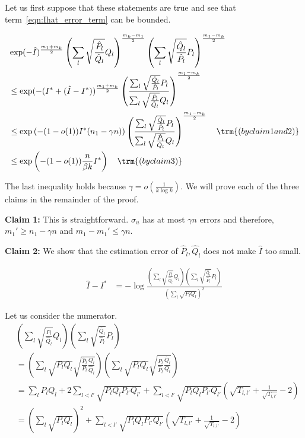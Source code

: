 \documentclass{article}
\begin{document}
Let us first suppose that these statements are true and see that term~\ref{eqn:Ihat_error_term} can be bounded. 


\begin{align*}
& \exp( - \hat{I} )^{\frac{m_1 + m_k}{2}}  \left( \sum_l \sqrt{\frac{\hat{P}_l}{\hat{Q}_l}} Q_l \right)^{\frac{m_k - m_1}{2}} 
 \left( \sum_l \sqrt{\frac{\hat{Q}_l}{\hat{P}_l}} P_l \right)^{\frac{m_1 - m_k}{2}}  \\
&\leq  \exp( - (I^* + (\hat{I} - I^*) )^{\frac{m_1 + m_k}{2}}  
 \left( \frac{\sum_l \sqrt{\frac{\hat{Q}_l}{\hat{P}_l}} P_l}
             {\sum_l \sqrt{\frac{\hat{P}_l}{\hat{Q}_l}} Q_l} \right)^{\frac{m_1 - m_k}{2}}  
  \\
&\leq \exp \left( - (1-o(1)) I^* (n_1 - \gamma n) \right) 
   \left( \frac{\sum_l \sqrt{\frac{\hat{Q}_l}{\hat{P}_l}} P_l}
             {\sum_l \sqrt{\frac{\hat{P}_l}{\hat{Q}_l}} Q_l} \right)^{\frac{m_1 - m_k}{2}}  
   \quad \trm{(by claim 1 and 2)}\\
&\leq \exp \left( - (1-o(1)) \frac{n}{\beta k} I^*  \right) 
   \quad \trm{(by claim 3)}
\end{align*}

The last inequality holds because $\gamma = o\left( \frac{1}{k \log k} \right)$. We will prove each of the three claims in the remainder of the proof.

\textbf{Claim 1:} This is straightforward. $\sigma_u$ has at most $\gamma n$ errors and therefore, $m_1' \geq n_1 - \gamma n$ and $m_1 - m_1' \leq \gamma n$. 

\textbf{Claim 2:} We show that the estimation error of $\hat{P}_l, \hat{Q}_l$ does not make $\hat{I}$ too small.

\begin{align}
\hat{I} - I^* &= - \log \frac{ 
     \left( \sum_l \sqrt{\frac{\hat{P}_l}{\hat{Q}_l}} Q_l \right)
     \left( \sum_l \sqrt{\frac{\hat{Q}_l}{\hat{P}_l}} P_l \right)}{ 
          \left( \sum_l \sqrt{P_l Q_l} \right)^2 } \label{eqn:Ihat_Istar}
\end{align}

Let us consider the numerator.
\begin{align*}
& \left( \sum_l \sqrt{ \frac{\hat{P}_l}{\hat{Q}_l}} Q_l \right)
\left( \sum_l \sqrt{ \frac{\hat{Q}_l}{\hat{P}_l}} P_l \right) \\
&= \left( \sum_l \sqrt{ P_l Q_l} \sqrt{ \frac{\hat{P}_l}{P_l} \frac{Q_l}{\hat{Q}_l}} \right) 
     \left( \sum_l \sqrt{P_l Q_l} \sqrt{ \frac{P_l}{\hat{P}_l} \frac{\hat{Q}_l}{ Q_l}} \right) \\
&= \sum_l P_l Q_l + 2\sum_{l < l'} \sqrt{P_l Q_l P_{l'} Q_{l'}} + 
   \sum_{l < l'} \sqrt{P_l Q_l P_{l'} Q_{l'}} \left( \sqrt{T_{l,l'}} + \frac{1}{\sqrt{T_{l,l'}}} - 2 \right) \\
&= \left( \sum_l \sqrt{P_l Q_l} \right)^2 + \sum_{l < l'} 
                  \sqrt{P_l Q_l P_{l'} Q_{l'}} \left( \sqrt{T_{l,l'}} + \frac{1}{\sqrt{T_{l,l'}}} - 2 \right) 
\end{align*}
\end{document}
